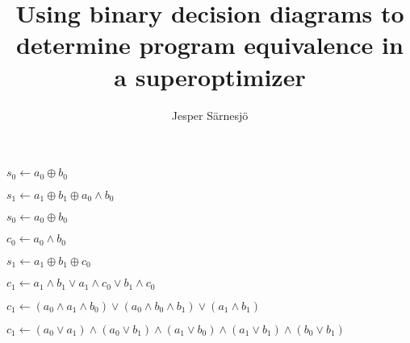 \documentclass{beamer}
\title{Using binary decision diagrams to determine program equivalence in a superoptimizer}
\author{Jesper Särnesjö}
\date{}
\renewcommand{\gets}{\leftarrow}
\newcommand{\AND}{\land}
\newcommand{\IOR}{\lor}
\newcommand{\XOR}{\oplus}
\begin{document}
\begin{frame}
\titlepage
\end{frame}

\begin{frame}
\begin{figure}

\end{figure}
\end{frame}

\begin{frame}
\begin{figure}

\end{figure}
\end{frame}

\begin{frame}
\begin{figure}

\end{figure}
\end{frame}

\begin{frame}
$s_0 \gets a_0 \XOR b_0$

$s_1 \gets a_1 \XOR b_1 \XOR a_0 \AND b_0$
\end{frame}

\begin{frame}
$s_0 \gets a_0 \XOR b_0$

$c_0 \gets a_0 \AND b_0$

$s_1 \gets a_1 \XOR b_1 \XOR c_0$

$c_1 \gets a_1 \AND b_1 \IOR a_1 \AND c_0 \IOR b_1 \AND c_0$
\end{frame}

\begin{frame}
$c_1 \gets (a_0 \AND a_1 \AND b_0) \IOR (a_0 \AND b_0 \AND b_1) \IOR (a_1 \AND b_1)$ %

$c_1 \gets (a_0 \IOR a_1) \AND (a_0 \IOR b_1) \AND (a_1 \IOR b_0) \AND (a_1 \IOR b_1) \AND (b_0 \IOR b_1)$ %
\end{frame}

\begin{frame}
\begin{figure}

\end{figure}
\end{frame}

\begin{frame}
\begin{figure}

\end{figure}
\end{frame}
\end{document}
